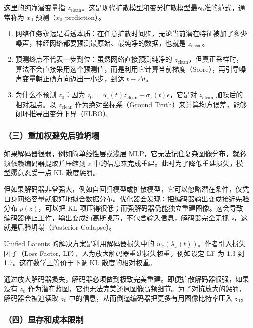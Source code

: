 这里的纯净潜变量指 \(z_{\mathrm{clean}}\)。这是现代扩散模型和变分扩散模型最标准的范式，通常称为 \(x_0\) 预测（\(x_0\)-prediction）。

\begin{enumerate}
\def\labelenumi{\arabic{enumi}.}
\tightlist
\item
  网络任务永远是看透本质：在任意扩散时间步，无论当前潜在特征被加了多少噪声，神经网络都要预测最原始、最纯净的数据，也就是 \(z_{\mathrm{clean}}\)。
\item
  预测终点不代表一步到位：虽然网络直接预测纯净的 \(z_{\mathrm{clean}}\)，但真正采样时，算法不会直接采用这个预测值，而是利用它计算当前梯度（Score），再引导噪声变量朝正确方向迈出一小步，到达 \(t-\Delta t\)。
\item
  为什么不预测 \(z_0\)：因为 \(z_0=\alpha_z(t)z_{\mathrm{clean}}+\sigma_z(t)\epsilon\)，它是对 \(z_{\mathrm{clean}}\) 加噪后的相对起点。以 \(z_{\mathrm{clean}}\) 作为绝对坐标系（Ground Truth）来计算均方误差，能够闭环推导出变分下界（ELBO）。
\end{enumerate}

\hypertarget{ux4e09ux91cdux52a0ux6743ux907fux514dux540eux9a8cux574dux584c}{%
\subsubsection{（三）重加权避免后验坍塌}\label{ux4e09ux91cdux52a0ux6743ux907fux514dux540eux9a8cux574dux584c}}

如果解码器很弱，例如简单线性层或浅层 MLP，它无法记住复杂图像分布，就必须依赖编码器提取并压缩到 \(z\) 中的信息来完成重建。此时为了降低重建损失，模型愿意忍受一点 KL 散度惩罚。

但如果解码器非常强大，例如自回归模型或扩散模型，它可以忽略潜在条件，仅凭自身网络容量就很好地拟合数据分布。优化器会发现：把编码器输出变成接近先验分布 \(p(z)\)，可以把 KL 项压得很低；而强解码器仍能独立重建图像。这会导致编码器停止工作，输出变成纯高斯噪声，不包含输入信息，解码器完全无视 \(z\)，这就是后验坍塌（Posterior Collapse）。

Unified Latents 的解决方案是利用解码器损失中的 \(w_x(\lambda_x(t))\)。作者引入损失因子（Loss Factor, LF），人为放大解码器重建损失权重，例如设定 LF 为 1.3 到 1.7。这在数学上等价于下调 KL 散度的相对权重。

通过放大解码器损失，解码器必须做到极致完美重建。即便扩散解码器很强，如果没有 \(z_0\) 作为潜在蓝图，它也无法完美还原图像高频细节。为了对抗放大的惩罚，解码器会被迫读取 \(z_0\) 中的信息，从而倒逼编码器把更多有用图像比特率压入 \(z_0\)。

\hypertarget{ux56dbux663eux5b58ux548cux6210ux672cux9650ux5236}{%
\subsubsection{（四）显存和成本限制}\label{ux56dbux663eux5b58ux548cux6210ux672cux9650ux5236}}

